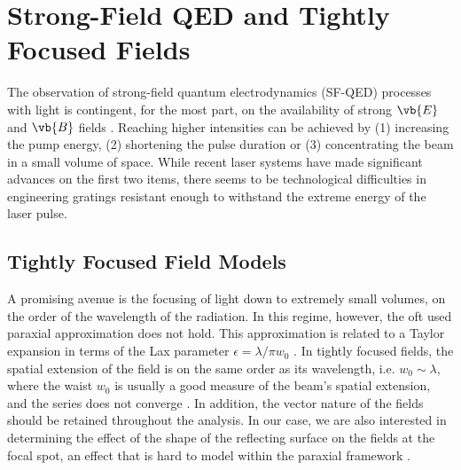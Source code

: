 \documentclass[11pt,SymmetricalJury]{inrsthesis/inrsthesis}
\begin{document}
\section{Strong-Field QED and Tightly Focused Fields}

The observation of strong-field quantum electrodynamics (SF-QED) processes with
light is contingent, for the most part, on the availability of strong $\vb{E}$
and $\vb{B}$ fields \cite{DiPiazza2012}.  Reaching higher
intensities can be achieved by (1) increasing the pump energy, (2) shortening
the pulse duration or (3) concentrating the beam in a small volume of space.
While recent laser systems have made significant advances on the first two
items, there seems to be technological difficulties in engineering gratings
resistant enough to withstand the extreme energy of the laser pulse.


\subsection{Tightly Focused Field Models}

A promising avenue is the focusing of light down to extremely small volumes, on
the order of the wavelength of the radiation. In this regime, however, the oft
used paraxial approximation does not hold. This approximation is related to a
Taylor expansion in terms of the Lax parameter $\epsilon=\lambda/\pi w_0$
\cite{Lax1975}. In tightly focused fields, the spatial extension of the field is
on the same order as its wavelength, i.e. $w_0\sim\lambda$, where the waist
$w_0$ is usually a good measure of the beam's spatial extension, and the series
does not converge \cite{Borghi2003}. In addition, the vector nature of the
fields should be retained throughout the analysis. In our case, we are also
interested in determining the effect of the shape of the reflecting surface on
the fields at the focal spot, an effect that is hard to model within the
paraxial framework \cite{Tkaczyk2012}.
\end{document}

